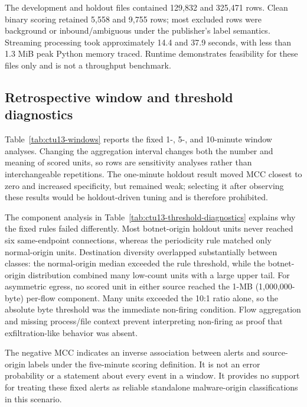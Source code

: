 \documentclass[11pt,a4paper,onecolumn]{IEEEtran}
\begin{document}


The development and holdout files contained 129,832 and 325,471 rows. Clean binary scoring retained 5,558 and 9,755 rows; most excluded rows were background or inbound/ambiguous under the publisher's label semantics. Streaming processing took approximately 14.4 and 37.9 seconds, with less than 1.3 MiB peak Python memory traced. Runtime demonstrates feasibility for these files only and is not a throughput benchmark.

\subsection{Retrospective window and threshold diagnostics}

Table~\ref{tab:ctu13-windows} reports the fixed 1-, 5-, and 10-minute window analyses. Changing the aggregation interval changes both the number and meaning of scored units, so rows are sensitivity analyses rather than interchangeable repetitions. The one-minute holdout result moved MCC closest to zero and increased specificity, but remained weak; selecting it after observing these results would be holdout-driven tuning and is therefore prohibited.



The component analysis in Table~\ref{tab:ctu13-threshold-diagnostics} explains why the fixed rules failed differently. Most botnet-origin holdout units never reached six same-endpoint connections, whereas the periodicity rule matched only normal-origin units. Destination diversity overlapped substantially between classes: the normal-origin median exceeded the rule threshold, while the botnet-origin distribution combined many low-count units with a large upper tail. For asymmetric egress, no scored unit in either source reached the 1-MB (1,000,000-byte) per-flow component. Many units exceeded the 10:1 ratio alone, so the absolute byte threshold was the immediate non-firing condition. Flow aggregation and missing process/file context prevent interpreting non-firing as proof that exfiltration-like behavior was absent.

The negative MCC indicates an inverse association between alerts and source-origin labels under the five-minute scoring definition. It is not an error probability or a statement about every event in a window. It provides no support for treating these fixed alerts as reliable standalone malware-origin classifications in this scenario.
\end{document}
